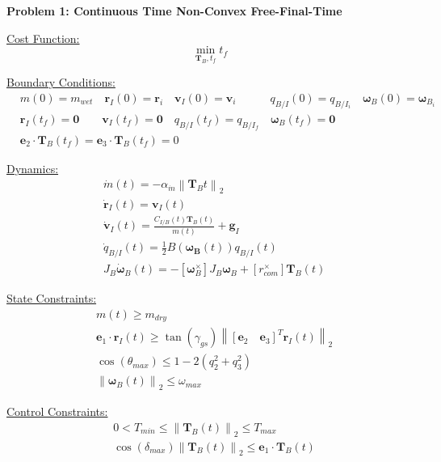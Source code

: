 \begin{mdframed}
\textbf{Problem 1: Continuous Time Non-Convex Free-Final-Time}

\underline{Cost Function:}
\begin{equation*}
\min_{\mathbf{T}_B, t_f} t_f
\end{equation*}

\underline{Boundary Conditions:}  
\begin{align*}
& m(0) = m_{wet} \quad \mathbf{r}_I(0) = \mathbf{r}_i \quad \mathbf{v}_I(0) = \mathbf{v}_i \quad \quad \quad{q}_{B/I}(0) = {q}_{B/I _{i}} \quad \bm{\omega}_B(0) = \bm{\omega}_{B _{i}} \\
& \mathbf{r}_I(t_f) = \mathbf{0} \quad \quad \mathbf{v}_I(t_f) = \mathbf{0} \quad {q}_{B/I}(t_f) = {q}_{B/I _ {f}} \quad \bm{\omega}_B(t_f) = \mathbf{0} \\
& \mathbf{e}_2 \cdot \mathbf{T}_B(t_f) = \mathbf{e}_3 \cdot \mathbf{T}_B(t_f) = 0
\end{align*}

\underline{Dynamics:}  
\begin{align*}
& \dot{m}(t) = -\alpha_{\dot{m}} \left\lVert \mathbf{T}_B{t} \right\rVert _2 \\
& \dot{\mathbf{r}}_I(t) = \mathbf{v}_I(t) \\
& \dot{\mathbf{v}}_I(t) = \frac{C_{I/B}(t)\mathbf{T}_B(t)}{m(t)} + \mathbf{g}_I \\
 & \dot{q}_{B/I}(t) = \frac{1}{2} B(\bm{\omega_B}(t)) q_{B/I}(t) \\
& J_B \dot{\bm{\omega}}_B(t) = -\left[\bm{\omega}_B ^ \times\right] J_B \bm{\omega}_B + \left[r_{com}^\times \right]\mathbf{T}_B(t)
\end{align*}

\underline{State Constraints:}  
\begin{align*}
& m(t) \geq m_{dry} \\
& \mathbf{e}_1 \cdot \mathbf{r}_I(t) \geq \tan(\gamma_{gs}) \left\lVert \left[\mathbf{e}_2 \quad \mathbf{e}_3\right]^T \mathbf{r}_I(t) \right\lVert_2 \\
& \cos(\theta_{max}) \leq 1-2(q_{2}^{2}+q_{3}^{2}) \\
& \left \lVert \bm{\omega}_B(t) \right \lVert_2 \leq \omega_{max}
\end{align*}

\underline{Control Constraints:}  
\begin{align*}
& 0 < T_{min} \leq \left \lVert \bm{T}_B(t) \right \lVert_2 \leq T_{max} \\
& \cos(\delta_{max}) \left \lVert \bm{T}_B(t) \right \lVert_2 \leq \bm{e}_1 \cdot \bm{T}_B(t)
\end{align*}

\end{mdframed}




